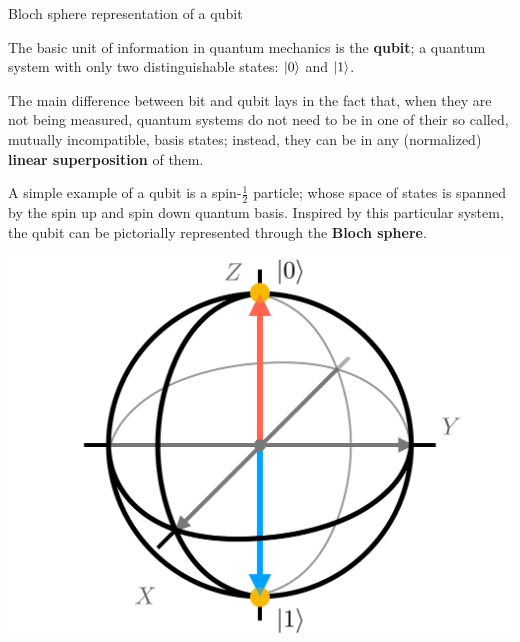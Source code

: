 \documentclass[9pt, handout, aspectratio=169]{beamer}	%
\begin{document}

\begin{frame}{Bloch sphere representation of a qubit}

	\begin{multicols}{2}

		The basic unit of information in quantum mechanics is the \textbf{qubit}; a quantum system with only two distinguishable states: $\ket{0}$ and $\ket{1}$.

		\medskip

		The main difference between bit and qubit lays in the fact that, when they are not being measured, quantum systems do not need to be in one of their so called, mutually incompatible, basis states; instead, they can be in any (normalized) \textbf{linear superposition} of them.

		\medskip

		A simple example of a qubit is a spin-$\frac{1}{2}$ particle; whose space of states is spanned by the spin up and spin down quantum basis. Inspired by this particular system, the qubit can be pictorially represented through the \textbf{Bloch sphere}.


		\columnbreak

		\begin{center}
			\includegraphics[width=.40\paperwidth]{Figures/quantum-background/bloch-sphere}
		\end{center}

	\end{multicols}

\end{frame}
\end{document}
